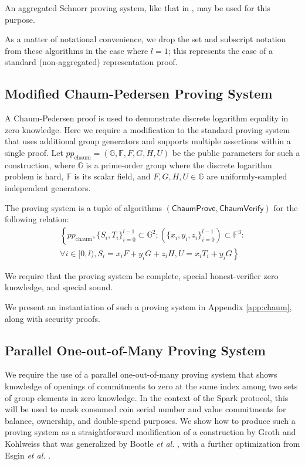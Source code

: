 \documentclass{llncs}
\newcommand{\G}{\mathbb{G}}
\newcommand{\F}{\mathbb{F}}
\newcommand{\func}[1]{\mathsf{#1}}
\begin{document}
An aggregated Schnorr proving system, like that in \cite{batchschnorr}, may be used for this purpose.

As a matter of notational convenience, we drop the set and subscript notation from these algorithms in the case where $l = 1$; this represents the case of a standard (non-aggregated) representation proof.


\subsection{Modified Chaum-Pedersen Proving System}

A Chaum-Pedersen proof is used to demonstrate discrete logarithm equality in zero knowledge.
Here we require a modification to the standard proving system that uses additional group generators and supports multiple assertions within a single proof.
Let $pp_{\text{chaum}} = (\G, \F, F, G, H, U)$ be the public parameters for such a construction, where $\G$ is a prime-order group where the discrete logarithm problem is hard, $\F$ is its scalar field, and $F,G,H,U \in \G$ are uniformly-sampled independent generators.

The proving system is a tuple of algorithms $(\func{ChaumProve},\func{ChaumVerify})$ for the following relation:
\begin{multline*}
\left\{ pp_{\text{chaum}}, \{S_i, T_i\}_{i=0}^{l-1} \subset \G^2 ; (\{x_i, y_i, z_i\}_{i=0}^{l-1}) \subset \F^3 : \right. \\
\left. \forall i \in [0,l), S_i = x_i F + y_i G + z_i H, U = x_i T_i + y_i G \right\}
\end{multline*}

We require that the proving system be complete, special honest-verifier zero knowledge, and special sound.

We present an instantiation of such a proving system in Appendix \ref{app:chaum}, along with security proofs.


\subsection{Parallel One-out-of-Many Proving System}

We require the use of a parallel one-out-of-many proving system that shows knowledge of openings of commitments to zero at the same index among two sets of group elements in zero knowledge.
In the context of the Spark protocol, this will be used to mask consumed coin serial number and value commitments for balance, ownership, and double-spend purposes.
We show how to produce such a proving system as a straightforward modification of a construction by Groth and Kohlweiss \cite{groth} that was generalized by Bootle \textit{et al.} \cite{bootle}, with a further optimization from Esgin \textit{et al.} \cite{matrict}.
\end{document}
